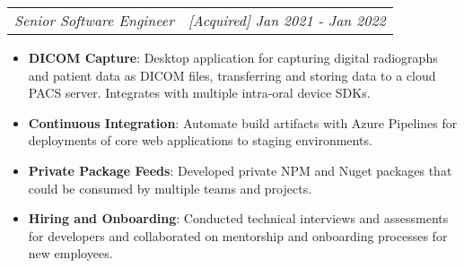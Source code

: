 \documentclass[letterpaper,11pt]{article}
\makeatletter
\newcommand{\resumeItem}[2]{
  \item\small{
    \textbf{#1}{: #2 \vspace{-2pt}}
  }
}
\newcommand{\resumeSubheading}[4]{
  \vspace{-1pt}\item
    \begin{tabular*}{0.97\textwidth}[t]{l@{\extracolsep{\fill}}r}
      \textbf{#1} & #2 \\
      \textit{\small#3} & \textit{\small #4} \\
    \end{tabular*}\vspace{-5pt}
}
\newcommand{\resumeSubheadingPosition}[2]{
  \vspace{-1pt}
    \begin{tabular*}{0.97\textwidth}[t]{l@{\extracolsep{\fill}}r}
      \textit{\small#1} & \textit{\small #2} \\
    \end{tabular*}\vspace{-5pt}
}
\newcommand{\resumeItemListStart}{\begin{itemize}}
\newcommand{\resumeItemListEnd}{\end{itemize}\vspace{-5pt}}
\makeatother
\begin{document}
  \resumeSubheadingPosition{Senior Software Engineer}{[Acquired] Jan 2021 - Jan 2022}
    \resumeItemListStart
      \resumeItem{DICOM Capture}
        {Desktop application for capturing digital radiographs and patient data as DICOM files, transferring and storing data to a cloud PACS server. Integrates with multiple intra-oral device SDKs.}
      \resumeItem{Continuous Integration}
        {Automate build artifacts with Azure Pipelines for deployments of core web applications to staging environments.}
      \resumeItem{Private Package Feeds}
        {Developed private NPM and Nuget packages that could be consumed by multiple teams and projects.}
      \resumeItem{Hiring and Onboarding}
        {Conducted technical interviews and assessments for developers and collaborated on mentorship and onboarding processes for new employees.}
    \resumeItemListEnd


      
\end{document}
